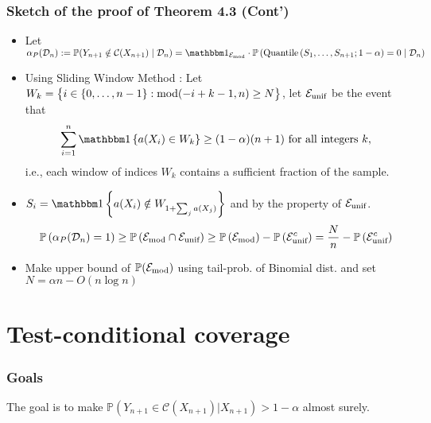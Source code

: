 \documentclass[compress]{beamer}
\begin{document}
\begin{frame}\frametitle{Sketch of the proof of Theorem 4.3 (Cont')}
	\begin{itemize}
		\item Let $\alpha_P(\cD_n) := \P(Y_{n+1} \notin \cC(X_{n+1}) \mid \cD_n) = \indsub{\cE_{\textnormal{mod}}}\cdot \P\left( \quantile\left(S_1,\dots,S_{n+1};1-\alpha\right)=0\mid \cD_n\right)$ 
		\item Using Sliding Window Method : Let $W_k = \big\{i\in \{0,\dots,n-1\} : \textnormal{mod}(-i + k - 1 , n )\geq N\big\}$, let $\mathcal{E}_{\textnormal{unif}}$ be the event that
\begin{equation*}\sum_{i=1}^n\ind{a(X_i)\in W_k} \geq (1-\alpha)(n+1)\textnormal{ for all integers $k$},\end{equation*}
i.e., each window of indices $W_k$ contains a sufficient fraction of the sample.
		\item $S_i = \ind{a(X_i)\notin W_{1 + \sum_j a(X_j)}}$ and by the property of $\mathcal{E}_{\textnormal{unif}}$.
		\small
		\begin{align*}
			\mathbb{P}\left(\alpha_P(\mathcal{D}_n)=1\right) \geq \mathbb{P}\left(\mathcal{E}_{\textnormal{mod}}\cap \mathcal{E}_{\textnormal{unif}}\right) \geq \mathbb{P}\left(\mathcal{E}_{\textnormal{mod}}\right) -  \mathbb{P}\left(\mathcal{E}_{\textnormal{unif}}^c\right)= \frac{N}{n} - \mathbb{P}\left(\mathcal{E}_{\textnormal{unif}}^c\right)
		\end{align*}
		\normalsize
		\item Make upper bound of $\mathbb{P}(\mathcal{E}_{\textnormal{mod}})$ using tail-prob. of Binomial dist. and set $N = \alpha n - O(n \log n)$
	\end{itemize}
\end{frame}

\section{Test-conditional coverage}
\begin{frame}
	\frametitle{Goals}
	The goal is to make $\mathbb{P}(Y_{n+1}\in \mathcal{C}(X_{n+1})|X_{n+1}) > 1-\alpha$ almost surely.\\ 
\end{frame}
\end{document}
